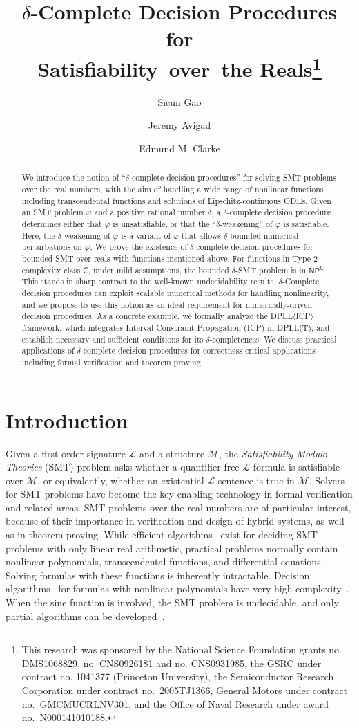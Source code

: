 \documentclass[envcountsect]{llncs}
\title{$\delta$-Complete Decision Procedures for\\Satisfiability~over~the Reals\thanks{This research was sponsored by the National Science Foundation grants no. DMS1068829, no. CNS0926181 and no. CNS0931985, the GSRC under contract no. 1041377 (Princeton University), the Semiconductor Research Corporation under contract no.~2005TJ1366, General Motors under contract no.~GMCMUCRLNV301, and the Office of Naval Research under award no.~N000141010188.}
}
\author{Sicun Gao \and Jeremy Avigad \and Edmund M. Clarke}
\institute{Carnegie Mellon University, Pittsburgh, PA 15213}
\begin{document}
\maketitle

\begin{abstract}
We introduce the notion of ``$\delta$-complete decision procedures'' for solving SMT problems over the real numbers, with the aim of handling a wide range of nonlinear functions including transcendental functions and solutions of Lipschitz-continuous ODEs. Given an SMT problem $\varphi$ and a positive rational number $\delta$, a $\delta$-complete decision procedure determines either that $\varphi$ is unsatisfiable, or that the ``$\delta$-weakening'' of $\varphi$ is satisfiable. Here, the $\delta$-weakening of $\varphi$ is a variant of $\varphi$ that allows $\delta$-bounded numerical perturbations on $\varphi$. We prove the existence of $\delta$-complete decision procedures for bounded SMT over reals with functions mentioned above. For functions in Type 2 complexity class $\mathsf{C}$, under mild assumptions, the bounded $\delta$-SMT problem is in $\mathsf{NP^C}$. This stands in sharp contrast to the well-known undecidability results. $\delta$-Complete decision procedures can exploit scalable numerical methods for handling nonlinearity, and we propose to use this notion as an ideal requirement for numerically-driven decision procedures. As a concrete example, we formally analyze the DPLL$\langle$ICP$\rangle$ framework, which integrates Interval Constraint Propagation (ICP) in DPLL(T), and establish necessary and sufficient conditions for its $\delta$-completeness. We discuss practical applications of $\delta$-complete decision procedures for correctness-critical applications including formal verification and theorem proving.\end{abstract}

\section{Introduction}

Given a first-order signature $\mathcal{L}$ and a structure $\mathcal{M}$, the {\em Satisfiability Modulo Theories} (SMT) problem asks whether a quantifier-free $\mathcal{L}$-formula is satisfiable over $\mathcal{M}$, or equivalently, whether an existential $\mathcal{L}$-sentence is true in $\mathcal{M}$. Solvers for SMT problems have become the key enabling technology in formal verification and related areas. SMT problems over the real numbers are of particular interest, because of their importance in verification and design of hybrid systems, as well as in theorem proving. While efficient algorithms~\cite{linear06} exist for deciding SMT problems with only linear real arithmetic, practical problems normally contain nonlinear polynomials, transcendental functions, and differential equations. Solving formulas with these functions is inherently intractable. Decision algorithms~\cite{collins} for formulas with nonlinear polynomials have very high complexity~\cite{BrownD07}. When the sine function is involved, the SMT problem is undecidable, and only partial algorithms can be developed~\cite{DBLP:journals/lmcs/AvigadF06,DBLP:journals/jar/AkbarpourP10}.
\end{document}
